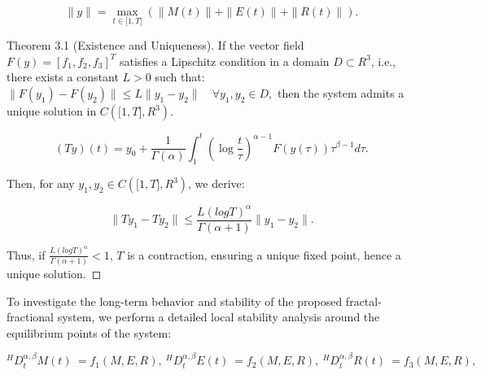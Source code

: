 \documentclass[10pt]{NSP1}
\begin{document}
\[
\parallel y \parallel = \max_{t \in \lbrack 1,T\rbrack}\left( \parallel M(t) \parallel + \parallel E(t) \parallel + \parallel R(t) \parallel \right).
\]

Theorem 3.1 (Existence and Uniqueness). If the vector field \(F(y) = \left\lbrack f_{1},f_{2},f_{3} \right\rbrack^{T}\) satisfies a Lipschitz condition in a domain \(D \subset R^{3}\), i.e., there exists a constant \(L > 0\) such that: \(\parallel F\left( y_{1} \right) - F\left( y_{2} \right) \parallel \leq L \parallel y_{1} - y_{2} \parallel \quad\forall y_{1},y_{2} \in D,\) then the system admits a unique solution in \(C\left( \lbrack 1,T\rbrack,R^{3} \right)\).

\par\vspace{9.0pt}\vspace{9.0pt}

\[
(Ty)(t) = y_{0} + \frac{1}{\Gamma(\alpha)}\int_{1}^{t}{}\left( \log\frac{t}{\tau} \right)^{\alpha - 1}F\left( y(\tau) \right)\tau^{\beta - 1}d\tau.
\]

Then, for any \(y_{1},y_{2} \in C\left( \lbrack 1,T\rbrack,R^{3} \right)\), we derive:

\[
\parallel Ty_{1} - Ty_{2} \parallel \leq \frac{L(logT)^{\alpha}}{\Gamma(\alpha + 1)} \parallel y_{1} - y_{2} \parallel .
\]

Thus, if \(\frac{L(logT)^{\alpha}}{\Gamma(\alpha + 1)} < 1\), \(T\) is a contraction, ensuring a unique fixed point, hence a unique solution. ◻

\par\medskip{}\smallskip

To investigate the long-term behavior and stability of the proposed fractal-fractional system, we perform a detailed local stability analysis around the equilibrium points of the system:

\[
^{H}D_{t}^{\alpha,\beta}M(t)\ = f_{1}(M,E,R),\ ^{H}D_{t}^{\alpha,\beta}E(t)\ = f_{2}(M,E,R),\ ^{H}D_{t}^{\alpha,\beta}R(t)\ = f_{3}(M,E,R),\
\]

\par\vspace{9.0pt}\vspace{9.0pt}
\end{document}

